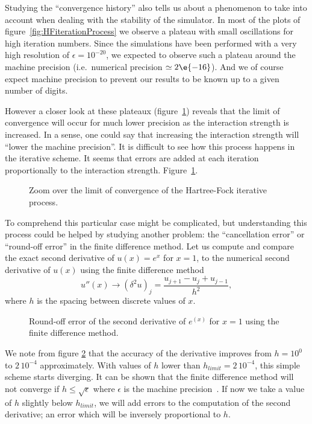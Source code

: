 Studying the ``convergence history'' also tells us about a phenomenon to take into account when dealing with the stability of the simulator. In most of the plots of figure~\ref{fig:HFiterationProcess} we observe a plateau with small oscillations for high iteration numbers. Since the simulations have been performed with a very high resolution of $\epsilon=10^{-20}$, we expected to observe such a plateau around the machine precision (i.e.\ numerical precision $\simeq 2\e{-16}$). And we of course expect machine precision to prevent our results to be known up to a given number of digits.

However a closer look at these plateaux (figure~\ref{fig:HFiterativePrecision}) reveals that the limit of convergence will occur for much lower precision as the interaction strength is increased. In a sense, one could say that increasing the interaction strength will ``lower the machine precision''.
It is difficult to see how this process happens in the iterative scheme. It seems that errors are added at each iteration proportionally to the interaction strength.
Figure~\ref{fig:HFiterativePrecision}.
\begin{figure}
\centering
\scalebox{0.7}{}
\caption{\label{fig:HFiterativePrecision} Zoom over the limit of convergence of the Hartree-Fock iterative process.}
\end{figure}

To comprehend this particular case might be complicated, but understanding this process could be helped by studying another problem: the ``cancellation error'' or ``round-off error'' in the finite difference method. Let us compute and compare the exact second derivative of $u(x)=e^{x}$ for $x=1$, to the numerical second derivative of $u(x)$ using the finite difference method
\begin{equation}
u''(x)\longrightarrow (\delta^2 u)_j = \frac{u_{j+1}-u_{j}+u_{j-1}}{h^2},
\end{equation}
where $h$ is the spacing between discrete values of $x$.
\begin{figure}
\centering
\scalebox{0.7}{}
\caption{\label{fig:roundoff} Round-off error of the second derivative of $e^(x)$ for $x=1$ using the finite difference method.}
\end{figure}
We note from figure \ref{fig:roundoff} that the accuracy of the derivative improves from $h=10^{0}$ to $2\, 10^{-4}$ approximately. With values of $h$ lower than $h_{limit}=2\,10^{-4}$, this simple scheme starts diverging. It can be shown that the finite difference method will not converge if $h \leq \sqrt{\epsilon}$ where $\epsilon$ is the machine precision~\cite{Goldberg1991,fadnavis1998}. If now we take a value of $h$ slightly below $h_{limit}$, we will add errors to the computation of the second derivative; an error which will be inversely proportional to $h$.

